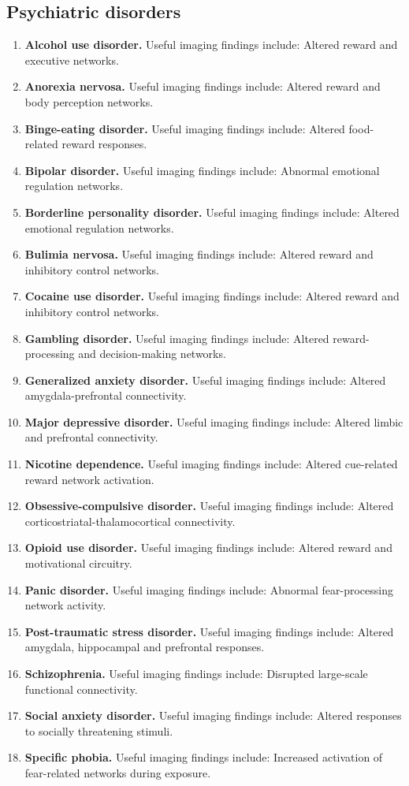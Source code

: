 \subsection{Psychiatric disorders}
\begin{enumerate}[leftmargin=*,itemsep=0.45em,topsep=0.4em]
\item \textbf{Alcohol use disorder.} Useful imaging findings include: Altered reward and executive networks.
\item \textbf{Anorexia nervosa.} Useful imaging findings include: Altered reward and body perception networks.
\item \textbf{Binge-eating disorder.} Useful imaging findings include: Altered food-related reward responses.
\item \textbf{Bipolar disorder.} Useful imaging findings include: Abnormal emotional regulation networks.
\item \textbf{Borderline personality disorder.} Useful imaging findings include: Altered emotional regulation networks.
\item \textbf{Bulimia nervosa.} Useful imaging findings include: Altered reward and inhibitory control networks.
\item \textbf{Cocaine use disorder.} Useful imaging findings include: Altered reward and inhibitory control networks.
\item \textbf{Gambling disorder.} Useful imaging findings include: Altered reward-processing and decision-making networks.
\item \textbf{Generalized anxiety disorder.} Useful imaging findings include: Altered amygdala-prefrontal connectivity.
\item \textbf{Major depressive disorder.} Useful imaging findings include: Altered limbic and prefrontal connectivity.
\item \textbf{Nicotine dependence.} Useful imaging findings include: Altered cue-related reward network activation.
\item \textbf{Obsessive-compulsive disorder.} Useful imaging findings include: Altered corticostriatal-thalamocortical connectivity.
\item \textbf{Opioid use disorder.} Useful imaging findings include: Altered reward and motivational circuitry.
\item \textbf{Panic disorder.} Useful imaging findings include: Abnormal fear-processing network activity.
\item \textbf{Post-traumatic stress disorder.} Useful imaging findings include: Altered amygdala, hippocampal and prefrontal responses.
\item \textbf{Schizophrenia.} Useful imaging findings include: Disrupted large-scale functional connectivity.
\item \textbf{Social anxiety disorder.} Useful imaging findings include: Altered responses to socially threatening stimuli.
\item \textbf{Specific phobia.} Useful imaging findings include: Increased activation of fear-related networks during exposure.
\end{enumerate}
